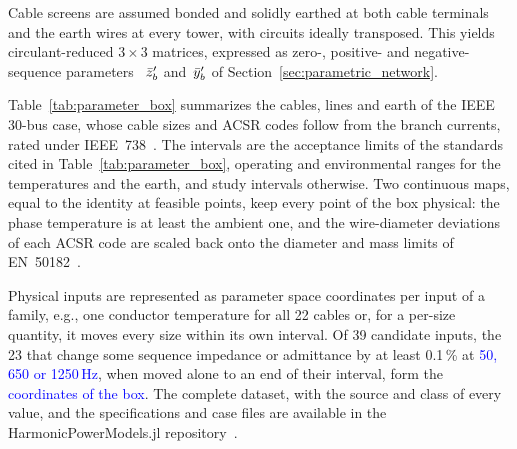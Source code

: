 Cable screens are assumed bonded and solidly earthed at both cable terminals and the earth wires at every tower, with circuits ideally transposed. This yields circulant-reduced $3 \times 3$ matrices, expressed as zero-, positive- and negative-sequence parameters ~$\bar{z}'_{b}$ and~$\bar{y}'_{b}$ of Section~\ref{sec:parametric_network}.

Table~\ref{tab:parameter_box} summarizes the cables, lines and earth of the IEEE 30-bus case, whose cable sizes and ACSR codes follow from the branch currents, rated under IEEE~738~\cite{ieee738_2023}. The intervals are the acceptance limits of the standards cited in Table~\ref{tab:parameter_box}, operating and environmental ranges for the temperatures and the earth, and study intervals otherwise. Two continuous maps, equal to the identity at feasible points, keep every point of the box physical: the phase temperature is at least the ambient one, and the wire-diameter deviations of each ACSR code are scaled back onto the diameter and mass limits of EN~50182~\cite{en50182_2001}.

Physical inputs are represented as parameter space coordinates per input of a family, e.g., one conductor temperature for all 22 cables or, for a per-size quantity, it moves every size within its own interval. Of 39 candidate inputs, the 23 that change some sequence impedance or admittance by at least 0.1\,\% at \textcolor{blue}{50, 650 or 1250\,Hz}, when moved alone to an end of their interval, form the \textcolor{blue}{coordinates of the box}. The complete dataset, with the source and class of every value, and the specifications and case files are available in the HarmonicPowerModels.jl repository~\cite{hpm_2026}.
